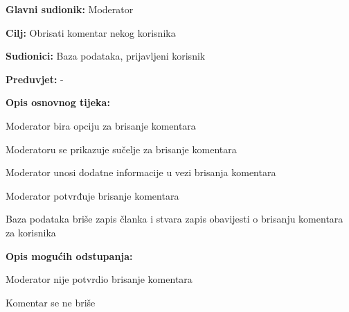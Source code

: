 \noindent {}
\begin{packed_item}

\item \textbf{Glavni sudionik:} Moderator
\item  \textbf{Cilj:} Obrisati komentar nekog korisnika
\item  \textbf{Sudionici:} Baza podataka, prijavljeni korisnik
\item  \textbf{Preduvjet:} -
\item  \textbf{Opis osnovnog tijeka:}

\item[] \begin{packed_enum}

    \item Moderator bira opciju za brisanje komentara
    \item Moderatoru se prikazuje sučelje za brisanje komentara
    \item Moderator unosi dodatne informacije u vezi brisanja komentara
    \item Moderator potvrđuje brisanje komentara
    \item Baza podataka briše zapis članka i stvara zapis obavijesti o brisanju komentara za korisnika

\end{packed_enum}

\item  \textbf{Opis mogućih odstupanja:}

\item[] \begin{packed_item}

    \item[4.a] Moderator nije potvrdio brisanje komentara
    \item[] \begin{packed_enum}

        \item Komentar se ne briše

    \end{packed_enum}

\end{packed_item}
\end{packed_item}

